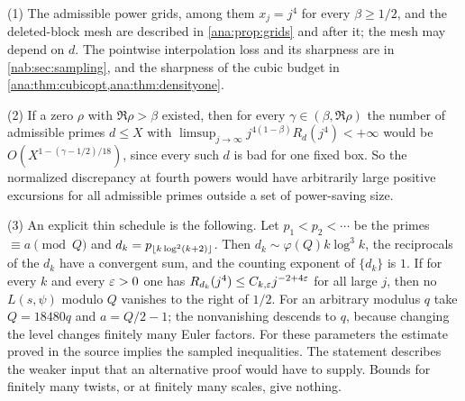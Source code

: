 \begin{remark}\label{ana:rem:schedule}
(1) The admissible power grids, among them $x_j=j^4$ for every $\beta\ge1/2$, and the
deleted-block mesh are described in \cref{ana:prop:grids} and after it; the mesh may depend on
$d$. The pointwise interpolation loss and its sharpness are in \cref{nab:sec:sampling}, and the
sharpness of the cubic budget in \cref{ana:thm:cubicopt,ana:thm:densityone}.

(2) If a zero $\rho$ with $\Re\rho>\beta$ existed, then for every $\gamma\in(\beta,\Re\rho)$
the number of admissible primes $d\le X$ with
$\limsup_{j\to\infty}j^{4(1-\beta)}R_d(j^4)<+\infty$ would be
$O(X^{1-(\gamma-1/2)/18})$, since every such $d$ is bad for one fixed box. So the normalized
discrepancy at fourth powers would have arbitrarily large positive excursions for all
admissible primes outside a set of power-saving size.

(3) An explicit thin schedule is the following. Let $p_1<p_2<\cdots$ be the primes
$\equiv a\pmod Q$ and $d_k=p_{\lfloor k\log^2(k+2)\rfloor}$. Then $d_k\sim\varphi(Q)k\log^3k$, the
reciprocals of the $d_k$ have a convergent sum, and the counting exponent of $\{d_k\}$ is $1$.
If for every $k$ and every $\varepsilon>0$ one has
$R_{d_k}(j^4)\le C_{k,\varepsilon}j^{-2+4\varepsilon}$ for all large $j$, then no $L(s,\psi)$ modulo $Q$
vanishes to the right of $1/2$. For an arbitrary modulus $q$ take $Q=18480q$ and $a=Q/2-1$;
the nonvanishing descends to $q$, because changing the level changes finitely many Euler
factors. For these parameters the estimate proved in the source implies the sampled
inequalities. The statement describes the weaker input that an alternative proof would have
to supply. Bounds for finitely many twists, or at finitely many scales, give nothing.
\end{remark}

